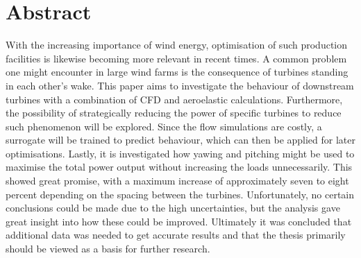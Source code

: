 \chapter*{Abstract}

With the increasing importance of wind energy, optimisation of such production facilities is likewise becoming more relevant in recent times. A common problem one might encounter in large wind farms is the consequence of turbines standing in each other's wake. This paper aims to investigate the behaviour of downstream turbines with a combination of CFD and aeroelastic calculations. Furthermore, the possibility of strategically reducing the power of specific turbines to reduce such phenomenon will be explored. Since the flow simulations are costly, a surrogate will be trained to predict behaviour, which can then be applied for later optimisations. Lastly, it is investigated how yawing and pitching might be used to maximise the total power output without increasing the loads unnecessarily. This showed great promise, with a maximum increase of approximately seven to eight percent depending on the spacing between the turbines. Unfortunately, no certain conclusions could be made due to the high uncertainties, but the analysis gave great insight into how these could be improved. Ultimately it was concluded that additional data was needed to get accurate results and that the thesis primarily should be viewed as a basis for further research.